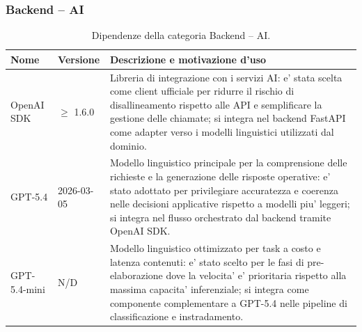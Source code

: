 \documentclass[a4paper, 11pt, oneside]{scrartcl}
\begin{document}
\subsubsection{Backend -- AI}
\begin{table}[H]
    \centering
    \renewcommand{\arraystretch}{1.2}
    \begin{tabularx}{\textwidth}{@{}l l X@{}}
        \toprule
        \textbf{Nome} & \textbf{Versione} & \textbf{Descrizione e motivazione d'uso} \\
        \midrule
        OpenAI SDK & $\geq$ 1.6.0 & Libreria di integrazione con i servizi AI: e' stata scelta come client ufficiale per ridurre il rischio di disallineamento rispetto alle API e semplificare la gestione delle chiamate; si integra nel backend FastAPI come adapter verso i modelli linguistici utilizzati dal dominio. \\
        GPT-5.4 & 2026-03-05 & Modello linguistico principale per la comprensione delle richieste e la generazione delle risposte operative: e' stato adottato per privilegiare accuratezza e coerenza nelle decisioni applicative rispetto a modelli piu' leggeri; si integra nel flusso orchestrato dal backend tramite OpenAI SDK. \\
        GPT-5.4-mini & N/D & Modello linguistico ottimizzato per task a costo e latenza contenuti: e' stato scelto per le fasi di pre-elaborazione dove la velocita' e' prioritaria rispetto alla massima capacita' inferenziale; si integra come componente complementare a GPT-5.4 nelle pipeline di classificazione e instradamento. \\
        \bottomrule
    \end{tabularx}
    \caption{Dipendenze della categoria Backend -- AI.}
    \label{tab:dip_backend_ai}
\end{table}
\end{document}
